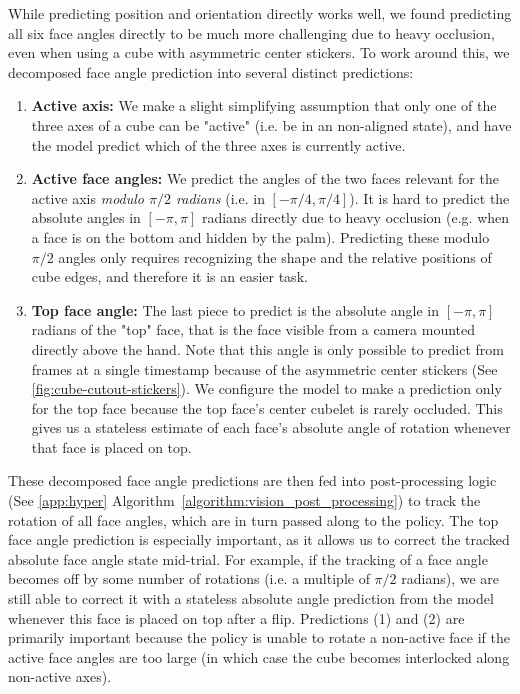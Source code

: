 While predicting position and orientation directly works well, we found predicting all six face angles directly to be much more challenging due to heavy occlusion, even when using a cube with asymmetric center stickers. To work around this, we decomposed face angle prediction into several distinct predictions:
\begin{enumerate}
    \item \textbf{Active axis:} We make a slight simplifying assumption that only one of the three axes of a cube can be "active" (i.e. be in an non-aligned state), and have the model predict which of the three axes is currently active.
    \item \textbf{Active face angles:} We predict the angles of the two faces relevant for the active axis \textit{modulo $\pi/2$ radians} (i.e. in $[-\pi/4, \pi/4]$). It is hard to predict the absolute angles in $[-\pi, \pi]$ radians directly due to heavy occlusion (e.g. when a face is on the bottom and hidden by the palm). Predicting these modulo $\pi/2$ angles only requires recognizing the shape and the relative positions of cube edges, and therefore it is an easier task. %
    \item \textbf{Top face angle:} The last piece to predict is the absolute angle in $[-\pi, \pi]$ radians of the "top" face, that is the face visible from a camera mounted directly above the hand. Note that this angle is only possible to predict from frames at a single timestamp because of the asymmetric center stickers (See \autoref{fig:cube-cutout-stickers}). We configure the model to make a prediction only for the top face because the top face's center cubelet is rarely occluded. This gives us a stateless estimate of each face's absolute angle of rotation whenever that face is placed on top.
\end{enumerate}

These decomposed face angle predictions are then fed into post-processing logic (See \autoref{app:hyper} Algorithm~\ref{algorithm:vision_post_processing}) to track the rotation of all face angles, which are in turn passed along to the policy. 
The top face angle prediction is especially important, as it allows us to correct the tracked absolute face angle state mid-trial. For example, if the tracking of a face angle becomes off by some number of rotations (i.e. a multiple of $\pi/2$ radians), we are still able to correct it with a stateless absolute angle prediction from the model whenever this face is placed on top after a flip.
Predictions (1) and (2) are primarily important because the policy is unable to rotate a non-active face if the active face angles are too large (in which case the cube becomes interlocked along non-active axes). 

